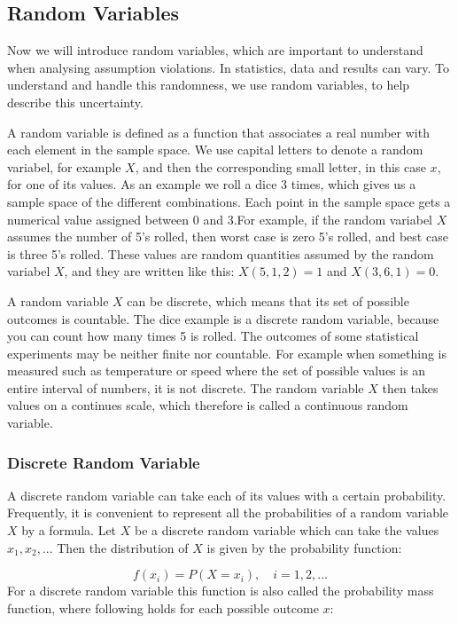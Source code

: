 
\subsection{Random Variables}
Now we will introduce random variables, which are important to understand when analysing assumption violations. In statistics, data and results can vary. To understand and handle this randomness, we use random variables, to help describe this uncertainty. \newline

\noindent A random variable is defined as a function that associates a real number with each element in the sample space. We use capital letters to denote a random variabel, for example $X$, and then the corresponding small letter, in this case $x$, for one of its values. As an example we roll a dice 3 times, which gives us a sample space of the different combinations. Each point in the sample space gets a numerical value assigned between 0 and 3.For example, if the random variabel $X$ assumes the number of 5's rolled, then worst case is zero 5's rolled, and best case is three 5's rolled. These values are random quantities assumed by the random variabel $X$, and they are written like this: $X(5,1,2) = 1$ and $X(3,6,1) = 0$.
\newline

\noindent A random variable $X$ can be discrete, which means that its set of possible outcomes is countable. The dice example is a discrete random variable, because you can count how many times 5 is rolled. The outcomes of some statistical experiments may be neither finite nor countable. For example when something is measured such as temperature or speed where the set of possible values is an entire interval of numbers, it is not discrete. The random variable $X$ then takes values on a continues scale, which therefore is called a continuous random variable.

\subsubsection{Discrete Random Variable}
\label{sec:disc}
A discrete random variable can take each of its values with a certain probability. Frequently, it is convenient to represent all the probabilities of a random variable $X$ by a formula. Let $X$ be a discrete random variable which can take the values $x_{1}, x_{2},...$ Then the distribution of $X$ is given by the probability function:

\begin{equation}
	f(x_{i})=P(X=x_{i}),\quad i=1,2,...
\end{equation}
\newline
For a discrete random variable this function is also called the probability mass function, where following holds for each possible outcome $x$:

